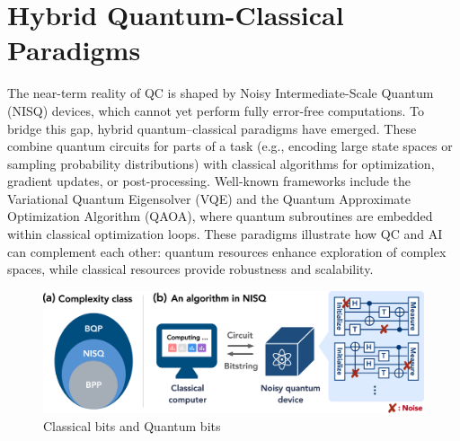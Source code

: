 \section{Hybrid Quantum-Classical Paradigms}
\hspace*{0.3in}The near-term reality of QC is shaped by Noisy Intermediate-Scale Quantum (NISQ) devices, which cannot yet perform fully error-free computations. To bridge this gap, hybrid quantum–classical paradigms have emerged. These combine quantum circuits for parts of a task (e.g., encoding large state spaces or sampling probability distributions) with classical algorithms for optimization, gradient updates, or post-processing. Well-known frameworks include the Variational Quantum Eigensolver (VQE) and the Quantum Approximate Optimization Algorithm (QAOA), where quantum subroutines are embedded within classical optimization loops. These paradigms illustrate how QC and AI can complement each other: quantum resources enhance exploration of complex spaces, while classical resources provide robustness and scalability.\\
\begin{figure}[htbp]
	\centering
	\includegraphics[width=1\linewidth]{nisq.png}
	\caption{Classical bits and Quantum bits}
	\label{fig:enter-label}
\end{figure}